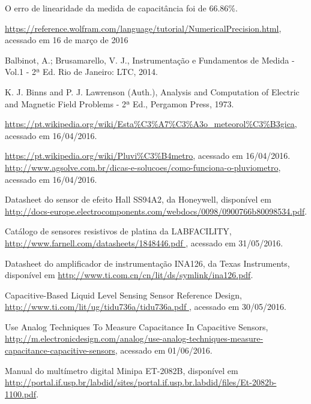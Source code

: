 \documentclass[a4paper]{instrumentacao}
\begin{document}
O erro de linearidade da medida de capacitância foi de 66.86\%.

\newpage
\begin{thebibliography}{9}
 \url{https://reference.wolfram.com/language/tutorial/NumericalPrecision.html}, acessado em 16 de março de 2016

  Balbinot, A.; Brusamarello, V. J., Instrumentação e Fundamentos de Medida - Vol.1 - 2ª Ed. Rio de Janeiro: LTC, 2014.

 K. J. Binns and P. J. Lawrenson (Auth.), Analysis and Computation of Electric and Magnetic Field Problems - 2ª Ed., Pergamon Press, 1973.

 \url{https://pt.wikipedia.org/wiki/Esta\%C3\%A7\%C3\%A3o_meteorol\%C3\%B3gica}, acessado em 16/04/2016.

 \url{https://pt.wikipedia.org/wiki/Pluvi\%C3\%B4metro}, acessado em 16/04/2016.
 \url{http://www.agsolve.com.br/dicas-e-solucoes/como-funciona-o-pluviometro}, acessado em 16/04/2016.

 Datasheet do sensor de efeito Hall SS94A2, da Honeywell, disponível em \url{http://docs-europe.electrocomponents.com/webdocs/0098/0900766b80098534.pdf}.

 Catálogo de sensores resistivos de platina da LABFACILITY, \url{http://www.farnell.com/datasheets/1848446.pdf }, acessado em 31/05/2016.

 Datasheet do amplificador de instrumentação INA126, da Texas Instruments, disponível em \url{http://www.ti.com.cn/cn/lit/ds/symlink/ina126.pdf}.

 Capacitive-Based Liquid Level Sensing Sensor Reference Design, \url{http://www.ti.com/lit/ug/tidu736a/tidu736a.pdf
}, acessado em 30/05/2016.

 Use Analog Techniques To Measure Capacitance In Capacitive Sensors, \url{http://m.electronicdesign.com/analog/use-analog-techniques-measure-capacitance-capacitive-sensors}, acessado em 01/06/2016.

 Manual do multímetro digital Minipa ET-2082B, disponível em \url{http://portal.if.usp.br/labdid/sites/portal.if.usp.br.labdid/files/Et-2082b-1100.pdf}.



\end{thebibliography}
\end{document}

